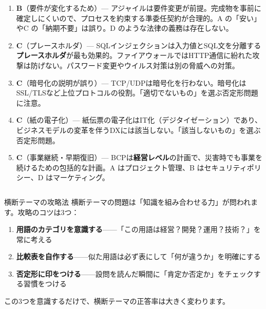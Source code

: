 \begin{enumerate}
  \item \textbf{B}（要件が変化するため）— アジャイルは要件変更が前提。完成物を事前に確定しにくいので、プロセスを約束する準委任契約が合理的。A の「安い」やC の「納期不要」は誤り。D のような法律の義務は存在しない。
  \item \textbf{C}（プレースホルダ）— SQLインジェクションは入力値とSQL文を分離する\textbf{プレースホルダ}が最も効果的。ファイアウォールではHTTP通信に紛れた攻撃は防げない。パスワード変更やウイルス対策は別の脅威への対策。
  \item \textbf{C}（暗号化の説明が誤り）— TCP/UDPは暗号化を行わない。暗号化はSSL/TLSなど上位プロトコルの役割。「適切でないもの」を選ぶ否定形問題に注意。
  \item \textbf{C}（紙の電子化）— 紙伝票の電子化はIT化（デジタイゼーション）であり、ビジネスモデルの変革を伴うDXには該当しない。「該当しないもの」を選ぶ否定形問題。
  \item \textbf{C}（事業継続・早期復旧）— BCPは\textbf{経営レベル}の計画で、災害時でも事業を続けるための包括的な計画。A はプロジェクト管理、B はセキュリティポリシー、D はマーケティング。
\end{enumerate}

\begin{column}{横断テーマの攻略法}
横断テーマの問題は「知識を組み合わせる力」が問われます。攻略のコツは3つ：
\begin{enumerate}
  \item \textbf{用語のカテゴリを意識する}——「この用語は経営？開発？運用？技術？」を常に考える
  \item \textbf{比較表を自作する}——似た用語は必ず表にして「何が違うか」を明確にする
  \item \textbf{否定形に印をつける}——設問を読んだ瞬間に「肯定か否定か」をチェックする習慣をつける
\end{enumerate}
この3つを意識するだけで、横断テーマの正答率は大きく変わります。
\end{column}

